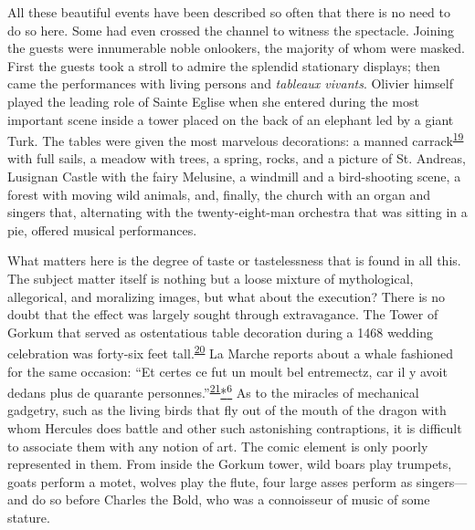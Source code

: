 All these beautiful events have been described so often that there is no
need to do so here. Some had even crossed the channel to witness the
spectacle. Joining the guests were innumerable noble onlookers, the
majority of whom were masked. First the guests took a stroll to admire
the splendid stationary displays; then came
\protect\hypertarget{20_ILLUSTRATIONS_FOLLOW_PAGE.xhtmlux5cux23page_306}{}{}the
performances with living persons and \emph{tableaux vivants}. Olivier
himself played the leading role of Sainte Eglise when she entered during
the most important scene inside a tower placed on the back of an
elephant led by a giant Turk. The tables were given the most marvelous
decorations: a manned
carrack\textsuperscript{\protect\hypertarget{20_ILLUSTRATIONS_FOLLOW_PAGE.xhtmlux5cux23id_435}{\protect\hyperlink{23_NOTES.xhtmlux5cux23id_436}{19}}}
with full sails, a meadow with trees, a spring, rocks, and a picture of
St. Andreas, Lusignan Castle with the fairy Melusine, a windmill and a
bird-shooting scene, a forest with moving wild animals, and, finally,
the church with an organ and singers that, alternating with the
twenty-eight-man orchestra that was sitting in a pie, offered musical
performances.

What matters here is the degree of taste or tastelessness that is found
in all this. The subject matter itself is nothing but a loose mixture of
mythological, allegorical, and moralizing images, but what about the
execution? There is no doubt that the effect was largely sought through
extravagance. The Tower of Gorkum that served as ostentatious table
decoration during a 1468 wedding celebration was forty-six feet
tall.\textsuperscript{\protect\hypertarget{20_ILLUSTRATIONS_FOLLOW_PAGE.xhtmlux5cux23id_433}{\protect\hyperlink{23_NOTES.xhtmlux5cux23id_434}{20}}}
La Marche reports about a whale fashioned for the same occasion: ``Et
certes ce fut un moult bel entremectz, car il y avoit dedans plus de
quarante
personnes.''\textsuperscript{\protect\hypertarget{20_ILLUSTRATIONS_FOLLOW_PAGE.xhtmlux5cux23id_431}{\protect\hyperlink{23_NOTES.xhtmlux5cux23id_432}{21}}}\protect\hypertarget{20_ILLUSTRATIONS_FOLLOW_PAGE.xhtmlux5cux23id_2665}{\protect\hyperlink{23_NOTES.xhtmlux5cux23id_2666}{*\textsuperscript{6}}}
As to the miracles of mechanical gadgetry, such as the living birds that
fly out of the mouth of the dragon with whom Hercules does battle and
other such astonishing contraptions, it is difficult to associate them
with any notion of art. The comic element is only poorly represented in
them. From inside the Gorkum tower, wild boars play trumpets, goats
perform a motet, wolves play the flute, four large asses perform as
singers---and do so before Charles the Bold, who was a connoisseur of
music of some stature.

